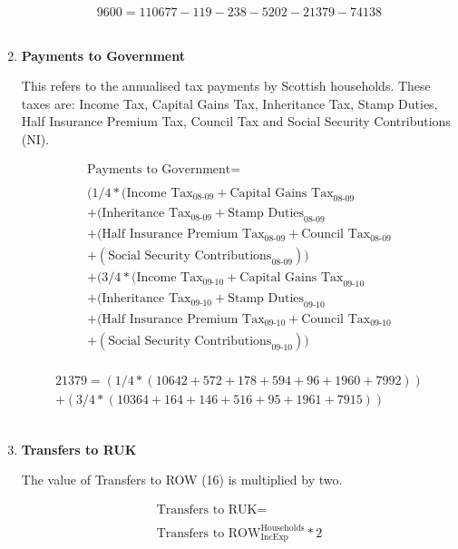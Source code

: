 \begin{enumerate}
\begin{equation} \nonumber
9600 = 110677-119-238-5202-21379-74138
\end{equation}\\


\item \textbf {Payments to Government}

This refers to the annualised tax payments by Scottish households. These taxes are: Income Tax, Capital Gains Tax, Inheritance Tax, Stamp Duties, Half Insurance Premium Tax, Council Tax and Social Security Contributions (NI). \cite{ScotGov2013b}

\begin{equation}
\begin{split}
\text{Payments to Government} =  \\ \\
(1/4*(\text{Income Tax}_\text{08-09}+\text{Capital Gains Tax}_\text{08-09}\\
+(\text{Inheritance Tax}_\text{08-09}+\text{Stamp Duties}_\text{08-09}\\
+(\text{Half Insurance Premium Tax}_\text{08-09}+\text{Council Tax}_\text{08-09}\\
+(\text{Social Security Contributions}_\text{08-09}))\\
+(3/4*(\text{Income Tax}_\text{09-10}+\text{Capital Gains Tax}_\text{09-10}\\
+(\text{Inheritance Tax}_\text{09-10}+\text{Stamp Duties}_\text{09-10}\\
+(\text{Half Insurance Premium Tax}_\text{09-10}+\text{Council Tax}_\text{09-10}\\
+(\text{Social Security Contributions}_\text{09-10}))\\
\end{split} \label{eq:2.5.17}
\end{equation}

\begin{equation} \nonumber
\begin{split}
21379=(1/4*(10642+572+178+594+96+1960+7992))\\
+(3/4*(10364+164+146+516+95+1961+7915))
\end{split}
\end{equation}\\


\item \textbf {Transfers to RUK}

The value of Transfers to ROW (16) is multiplied by two.

\begin{equation}
\begin{split}
\text{Transfers to RUK} =  \\ \\
\text{Transfers to ROW}^\text{Households}_\text{IncExp}*2
\end{split} \label{eq:2.5.18}
\end{equation}


\end{enumerate}
